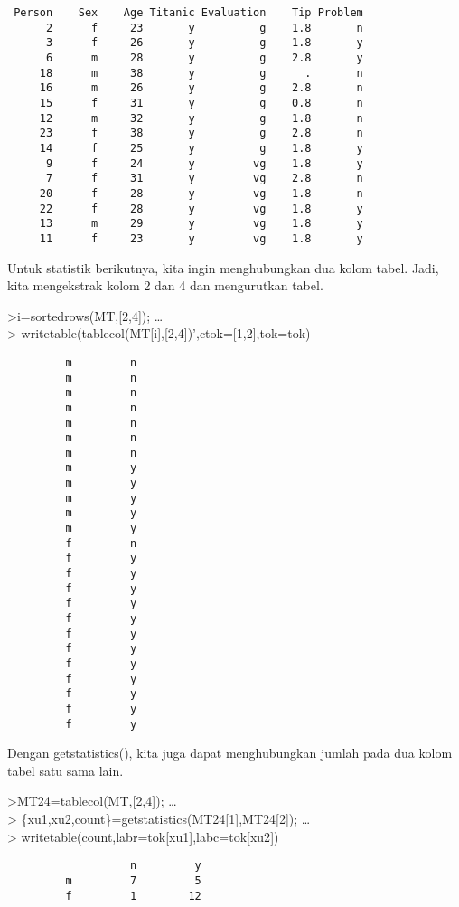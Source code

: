 \documentclass[
]{book}
\begin{document}
\begin{verbatim}
 Person    Sex    Age Titanic Evaluation    Tip Problem
      2      f     23       y          g    1.8       n
      3      f     26       y          g    1.8       y
      6      m     28       y          g    2.8       y
     18      m     38       y          g      .       n
     16      m     26       y          g    2.8       n
     15      f     31       y          g    0.8       n
     12      m     32       y          g    1.8       n
     23      f     38       y          g    2.8       n
     14      f     25       y          g    1.8       y
      9      f     24       y         vg    1.8       y
      7      f     31       y         vg    2.8       n
     20      f     28       y         vg    1.8       n
     22      f     28       y         vg    1.8       y
     13      m     29       y         vg    1.8       y
     11      f     23       y         vg    1.8       y
\end{verbatim}

Untuk statistik berikutnya, kita ingin menghubungkan dua kolom tabel. Jadi, kita mengekstrak kolom 2 dan 4 dan mengurutkan tabel.

\textgreater i=sortedrows(MT,{[}2,4{]}); \ldots{}\\
\textgreater{} writetable(tablecol(MT{[}i{]},{[}2,4{]})',ctok={[}1,2{]},tok=tok)

\begin{verbatim}
         m         n
         m         n
         m         n
         m         n
         m         n
         m         n
         m         n
         m         y
         m         y
         m         y
         m         y
         m         y
         f         n
         f         y
         f         y
         f         y
         f         y
         f         y
         f         y
         f         y
         f         y
         f         y
         f         y
         f         y
         f         y
\end{verbatim}

Dengan getstatistics(), kita juga dapat menghubungkan jumlah pada dua kolom tabel satu sama lain.

\textgreater MT24=tablecol(MT,{[}2,4{]}); \ldots{}\\
\textgreater{} \{xu1,xu2,count\}=getstatistics(MT24{[}1{]},MT24{[}2{]}); \ldots{}\\
\textgreater{} writetable(count,labr=tok{[}xu1{]},labc=tok{[}xu2{]})

\begin{verbatim}
                   n         y
         m         7         5
         f         1        12
\end{verbatim}
\end{document}
